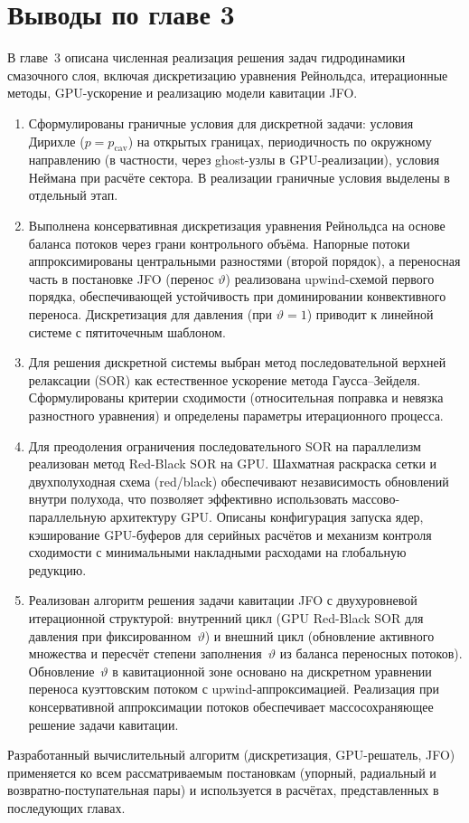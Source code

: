 \FloatBarrier
\section*{Выводы по главе 3}

В главе~3 описана численная реализация решения задач гидродинамики
смазочного слоя, включая дискретизацию уравнения Рейнольдса,
итерационные методы, GPU-ускорение и реализацию модели кавитации JFO.

\begin{enumerate}[wide, labelindent=\parindent, nosep]
  \item Сформулированы граничные условия для дискретной задачи:
    условия Дирихле ($p = p_{\mathrm{cav}}$) на открытых границах,
    периодичность по окружному направлению (в частности, через ghost-узлы
    в GPU-реализации), условия Неймана при расчёте сектора.
    В реализации граничные условия выделены в отдельный этап.
  \item Выполнена консервативная дискретизация уравнения Рейнольдса
    на основе баланса потоков через грани контрольного объёма.
    Напорные потоки аппроксимированы центральными разностями
    (второй порядок), а переносная часть в постановке JFO
    (перенос $\vartheta$) реализована upwind-схемой первого порядка,
    обеспечивающей устойчивость при доминировании конвективного переноса.
    Дискретизация для давления (при $\vartheta=1$) приводит к линейной
    системе с пятиточечным шаблоном.
  \item Для решения дискретной системы выбран метод последовательной
    верхней релаксации (SOR) как естественное ускорение метода
    Гаусса--Зейделя.  Сформулированы критерии сходимости
    (относительная поправка и невязка разностного уравнения)
    и определены параметры итерационного процесса.
  \item Для преодоления ограничения последовательного SOR
    на параллелизм реализован метод Red-Black SOR на GPU.
    Шахматная раскраска сетки и двухполуходная схема (red/black)
    обеспечивают независимость обновлений внутри полухода, что позволяет
    эффективно использовать массово-параллельную архитектуру GPU.
    Описаны конфигурация запуска ядер, кэширование GPU-буферов для серийных
    расчётов и механизм контроля сходимости с минимальными накладными
    расходами на глобальную редукцию.
  \item Реализован алгоритм решения задачи кавитации JFO
    с двухуровневой итерационной структурой: внутренний цикл
    (GPU Red-Black SOR для давления при фиксированном~$\vartheta$)
    и внешний цикл (обновление активного множества и пересчёт степени
    заполнения~$\vartheta$ из баланса переносных потоков).
    Обновление~$\vartheta$ в кавитационной зоне основано на дискретном
    уравнении переноса куэттовским потоком с upwind-аппроксимацией.
    Реализация при консервативной аппроксимации потоков обеспечивает
    массосохраняющее решение задачи кавитации.
\end{enumerate}

Разработанный вычислительный алгоритм (дискретизация, GPU-решатель, JFO)
применяется ко всем рассматриваемым постановкам (упорный, радиальный
и возвратно-поступательная пары) и используется в расчётах,
представленных в последующих главах.
